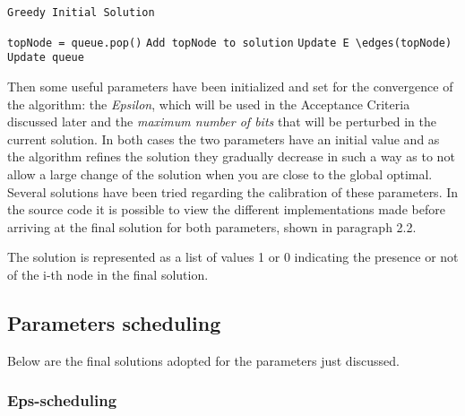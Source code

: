 \documentclass[11pt, oneside]{article}
\begin{document}
\begin{algorithm}
    \caption{ \texttt{Greedy Initial Solution}}
    \begin{algorithmic}

        		\State \texttt{topNode = queue.pop()}
        		\State \texttt{Add topNode to solution}
        		\State \texttt{Update E \textbackslash  edges(topNode)}
        		\State \texttt{Update queue}

            \EndWhile
    \end{algorithmic}
    
\end{algorithm}
\qquad

Then some useful parameters have been initialized and set for the convergence of the algorithm: the \textit{Epsilon}, which will be used in the Acceptance Criteria discussed later and the \textit{maximum number of bits} that will be perturbed in the current solution. In both cases the two parameters have an initial value and as the algorithm refines the solution they gradually decrease in such a way as to not allow a large change of the solution when you are close to the global optimal. Several solutions have been tried regarding the calibration of these parameters. In the source code it is possible to view the different implementations made before arriving at the final solution for both parameters, shown in paragraph 2.2.

\qquad 

The solution is represented as a list of values 1 or 0 indicating the presence or not of the i-th node in the final solution.

\qquad

\qquad

\qquad

\subsection{Parameters scheduling}

\qquad 

\qquad 

Below are the final solutions adopted for the parameters just discussed.

\qquad

\qquad


\subsubsection{Eps-scheduling}
\end{document}
